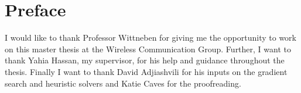 \chapter*{Preface}

I would like to thank Professor Wittneben for giving me the opportunity to work on this master thesis at the Wireless Communication Group.
Further, I want to thank Yahia Hassan, my supervisor, for his help and guidance throughout the thesis.
Finally I want to thank David Adjiashvili for his inputs on the gradient search and heuristic solvers and Katie Caves for the proofreading.
